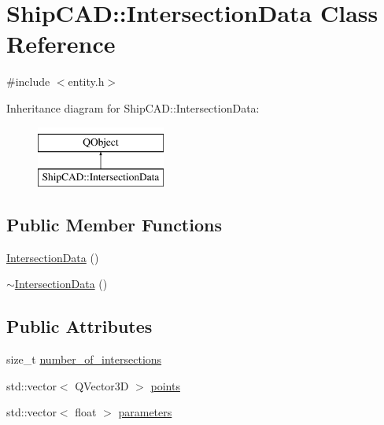 \hypertarget{classShipCAD_1_1IntersectionData}{\section{Ship\-C\-A\-D\-:\-:Intersection\-Data Class Reference}
\label{classShipCAD_1_1IntersectionData}
}


{\ttfamily \#include $<$entity.\-h$>$}

Inheritance diagram for Ship\-C\-A\-D\-:\-:Intersection\-Data\-:\begin{figure}[H]
\begin{center}
\leavevmode
\includegraphics[height=2.000000cm]{classShipCAD_1_1IntersectionData}
\end{center}
\end{figure}
\subsection*{Public Member Functions}
\begin{DoxyCompactItemize}
\item 
\hyperlink{classShipCAD_1_1IntersectionData_acc582d8820d6e60117e0bf5fe686ab76}{Intersection\-Data} ()
\item 
\hyperlink{classShipCAD_1_1IntersectionData_a80ee22151368715711e3713eae61d401}{$\sim$\-Intersection\-Data} ()
\end{DoxyCompactItemize}
\subsection*{Public Attributes}
\begin{DoxyCompactItemize}
\item 
size\-\_\-t \hyperlink{classShipCAD_1_1IntersectionData_a5b42e3b8b81d18963f9a07609b402628}{number\-\_\-of\-\_\-intersections}
\item 
std\-::vector$<$ Q\-Vector3\-D $>$ \hyperlink{classShipCAD_1_1IntersectionData_a926e126e42d95e01b39e2750a0e1fb95}{points}
\item 
std\-::vector$<$ float $>$ \hyperlink{classShipCAD_1_1IntersectionData_a06fcbb71243644bdea0e5b86da3b191c}{parameters}
\end{DoxyCompactItemize}


